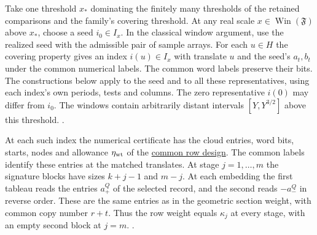 Take one threshold \(x_*\) dominating the finitely many thresholds of
the retained comparisons and the family's covering threshold. At any
real scale \(x\in\operatorname{Win}(\mathfrak F)\) above \(x_*\),
choose a seed \(i_0\in I_x\). In the classical window argument,
use the realized seed with the admissible pair of sample arrays.
For each \(u\in H\) the covering
property gives an index \(i(u)\in I_x\) with translate \(u\) and the
seed's \(a_t,b_t\) under the common numerical labels. The common word
labels preserve their bits. The constructions below apply to the seed
and to all these representatives, using each index's own periods,
tests and columns. The zero representative \(i(0)\) may differ from
\(i_0\). The windows contain arbitrarily distant intervals \([Y,Y^{3/2}]\)
above this threshold.
.

At each such index the numerical certificate has the cloud entries,
word bits, starts, nodes and allowance \(\eta_{\rm wt}\) of the
\hyperlink{proof.section-run-design}{common row design}. The common
labels identify these entries at the matched translates.
At stage \(j=1,\ldots,m\) the signature blocks have sizes \(k+j-1\)
and \(m-j\). At each embedding the first tableau reads the entries
\(a_+^Q\) of the selected record, and the second reads \(-a_-^Q\)
in reverse order. These are the same entries as in the geometric
section weight, with common copy number \(r+t\). Thus the row weight
equals \(\kappa_j\) at every stage, with an empty second block at
\(j=m\).
.

